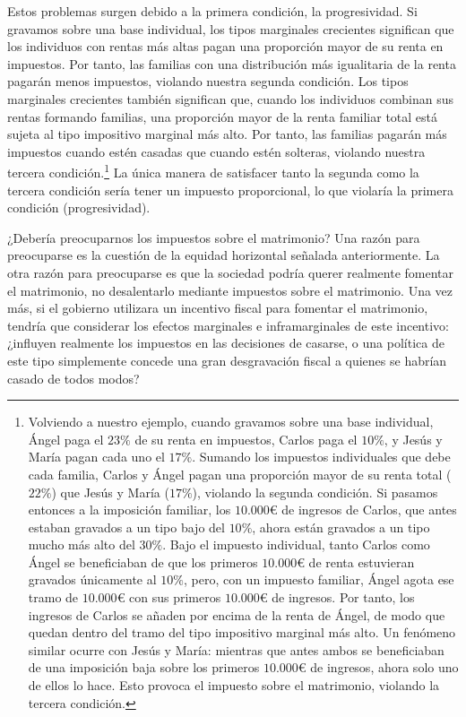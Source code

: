 \documentclass[10pt,a4paper]{article}
\begin{document}
Estos problemas surgen debido a la primera condición, la progresividad. Si gravamos sobre una base individual, los tipos marginales crecientes significan que los individuos con rentas más altas pagan una proporción mayor de su renta en impuestos. Por tanto, las familias con una distribución más igualitaria de la renta pagarán menos impuestos, violando nuestra segunda condición. Los tipos marginales crecientes también significan que, cuando los individuos combinan sus rentas formando familias, una proporción mayor de la renta familiar total está sujeta al tipo impositivo marginal más alto. Por tanto, las familias pagarán más impuestos cuando estén casadas que cuando estén solteras, violando nuestra tercera condición.\footnote{%
    Volviendo a nuestro ejemplo, cuando gravamos sobre una base individual, Ángel paga el $23\%$ de su renta en impuestos, Carlos paga el $10\%$, y Jesús y María pagan cada uno el $17\%$. Sumando los impuestos individuales que debe cada familia, Carlos y Ángel pagan una proporción mayor de su renta total ($22\%$) que Jesús y María ($17\%$), violando la segunda condición. Si pasamos entonces a la imposición familiar, los $10.000€$ de ingresos de Carlos, que antes estaban gravados a un tipo bajo del $10\%$, ahora están gravados a un tipo mucho más alto del $30\%$. Bajo el impuesto individual, tanto Carlos como Ángel se beneficiaban de que los primeros $10.000€$ de renta estuvieran gravados únicamente al $10\%$, pero, con un impuesto familiar, Ángel agota ese tramo de $10.000€$ con sus primeros $10.000€$ de ingresos. Por tanto, los ingresos de Carlos se añaden por encima de la renta de Ángel, de modo que quedan dentro del tramo del tipo impositivo marginal más alto. Un fenómeno similar ocurre con Jesús y María: mientras que antes ambos se beneficiaban de una imposición baja sobre los primeros $10.000€$ de ingresos, ahora solo uno de ellos lo hace. Esto provoca el impuesto sobre el matrimonio, violando la tercera condición.
} La única manera de satisfacer tanto la segunda como la tercera condición sería tener un impuesto proporcional, lo que violaría la primera condición (progresividad).

¿Debería preocuparnos los impuestos sobre el matrimonio? Una razón para preocuparse es la cuestión de la equidad horizontal señalada anteriormente. La otra razón para preocuparse es que la sociedad podría querer realmente fomentar el matrimonio, no desalentarlo mediante impuestos sobre el matrimonio. Una vez más, si el gobierno utilizara un incentivo fiscal para fomentar el matrimonio, tendría que considerar los efectos marginales e inframarginales de este incentivo: ¿influyen realmente los impuestos en las decisiones de casarse, o una política de este tipo simplemente concede una gran desgravación fiscal a quienes se habrían casado de todos modos?
\end{document}
